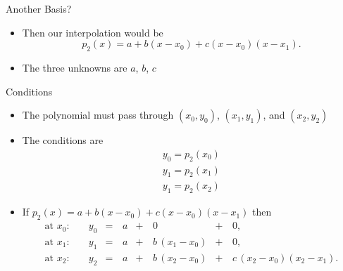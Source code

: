 \documentclass[10pt]{beamer}
\begin{document}
\begin{frame}{Another Basis?}

\begin{itemize}
    \item Then our interpolation would be 
    $$ p_2(x) = a + b(x-x_0) + c(x-x_0)(x-x_1).$$

    \item The three unknowns are $a$, $b$, $c$
\end{itemize}
\end{frame}
\begin{frame}{Conditions}

        \begin{itemize}
            \item The polynomial must pass through $(x_0,y_0)$, $(x_1,y_1)$, and $(x_2,y_2)$

            \item The conditions are 
            \begin{align*}
                y_0=p_2(x_0)\\ 
                y_1=p_2(x_1)\\ 
                y_1=p_2(x_2) 
            \end{align*}
    \item If $p_2(x) = a + b(x-x_0) + c(x-x_0)(x-x_1)$ then
    $$
    \begin{alignedat}{4}
  \text{at }x_0:\quad 
    &y_0  &={}&\,a
            &{}+&\,0
            &{}+&\,0,\\
  \text{at }x_1:\quad 
    &y_1  &={}&\,a
            &{}+&\,b\,(x_1 - x_0)
            &{}+&\,0,\\
  \text{at }x_2:\quad 
    &y_2  &={}&\,a
            &{}+&\,b\,(x_2 - x_0)
            &{}+&\,c\,(x_2 - x_0)(x_2 - x_1).
\end{alignedat}
    $$
        \end{itemize}
\end{frame}
\end{document}
